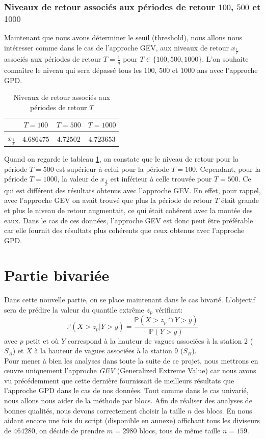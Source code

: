 \documentclass[a4paper,french,10pt]{article}
\begin{document}
\subsubsection{Niveaux de retour associés aux périodes de retour $100$, $500$ et $1000$}
Maintenant que nous avons déterminer le seuil (threshold), nous allons nous intéresser comme dans le cas de l'approche GEV, aux niveaux de retour $x_{\frac{1}{T}}$ associés aux périodes de retour $T = \frac{1}{q}$ pour $T \in \{100,500,1000\}$. L'on souhaite connaître le niveau qui sera dépassé tous les $100$, $500$ et $1000$ ans avec l'approche GPD.

\begin{table}[htp]
	\center
	\begin{tabular}{|c||c|c|c|}
		\hline
		\diagbox{Niveau de retour}{Périodes ou Années $T$} & $T = 100$ & $T = 500$ & $T = 1000$\\
		\hline
		$x_{\frac{1}{T}}$ & $4.686475$ & $4.72502$ & $4.723653$ \\
		\hline
	\end{tabular}
	\caption{Niveaux de retour associés aux périodes de retour $T$}
	\label{tab3}
\end{table}
Quand on regarde le tableau \ref{tab3}, on constate que le niveau de retour pour la période $T=500$ est supérieur à celui pour la période $T=100$. Cependant, pour la période $T=1000$, la valeur de $x_{\frac{1}{T}}$ est inférieur à celle trouvée pour $T = 500$. Ce qui est différent des résultats obtenus avec l'approche GEV. En effet, pour rappel, avec l'approche GEV on avait trouvé que plus la période de retour $T$ était grande et plus le niveau de retour augmentait, ce qui était cohérent avec la montée des eaux. Dans le cas de ces données, l'approche GEV est donc peut être préférable car elle fournit des résultats plus cohérents que ceux obtenus avec l'approche GPD.

\section{Partie bivariée}
Dans cette nouvelle partie, on se place maintenant dans le cas bivarié.
L'objectif sera de prédire la valeur du quantile extrême $z_p$ vérifiant:
\begin{equation}
	\label{quantile_extreme}
	\mathbb{P}(X > z_p | Y > y) = \frac{\mathbb{P}(X > z_p \cap Y > y)}{\mathbb{P}(Y > y)}
\end{equation}
avec $p$ petit et où $Y$ correspond à la hauteur de vagues associées à la station 2 ($S_A$) et $X$ à la hauteur de vagues associées à la station 9 ($S_B$). \\
Pour mener à bien les analyses dans toute la suite de ce projet, nous mettrons en œuvre uniquement l'approche \textit{GEV} (Generalized Extreme Value) car nous avons vu précédemment que cette dernière fournissait de meilleurs résultats que l'approche GPD dans le cas de nos données. Tout comme dans le cas univarié, nous allons nous aider de la méthode par blocs. Afin de réaliser des analyses de bonnes qualités, nous devons correctement choisir la taille $n$ des blocs. En nous aidant encore une fois du script (disponible en annexe) affichant tous les diviseurs de $464280$, on décide de prendre $m = 2980$ blocs, tous de même taille $n = 159$.
\end{document}
